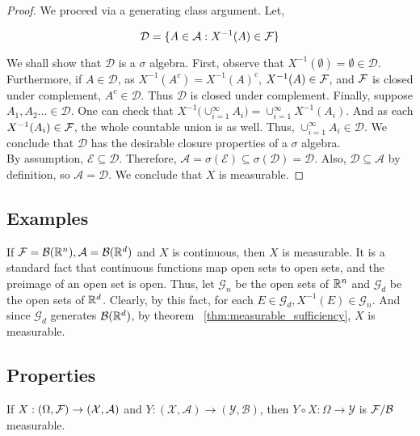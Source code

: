 \begin{proof}
    We proceed via a generating class argument. Let, 

    \[ \mathcal D = \{ A \in \mathcal A : X^{-1}(A) \in \mathcal F \} \]

    We shall show that $\mathcal D$ is a $\sigma$ algebra. First, observe that 
    $X^{-1}(\emptyset) = \emptyset \in \mathcal D$. Furthermore, if $A \in \mathcal D$, as 
    $X^{-1}(A^c) = X^{-1}(A)^c$, $X^{-1}(A) \in \mathcal F$, and $\mathcal F$ is closed under complement, 
    $A^c \in \mathcal D$. Thus $\mathcal D$ is closed under complement. Finally, suppose
    $A_1, A_2... \in \mathcal D$. One can check that $X^{-1}\big( \cup_{i=1}^\infty A_i \big) = \cup_{i=1}^\infty X^{-1}(A_i)$.
    And as each $X^{-1}(A_i) \in \mathcal F$, the whole countable union is as well. Thus, $\cup_{i=1}^\infty 
    A_i \in \mathcal D$. We conclude that $\mathcal D$ has the desirable closure properties of a 
    $\sigma$ algebra. \\ 

    By assumption, $\mathcal E \subseteq \mathcal D$. Therefore, 
    $\mathcal A = \sigma(\mathcal E) \subseteq \sigma(\mathcal D) = \mathcal D$. 
    Also, $\mathcal D \subseteq \mathcal A$ by definition, so $\mathcal A = \mathcal D$. 
    We conclude that $X$ is measurable.
\end{proof}

\subsection{Examples}

If $\mathcal F = \mathcal B(\mathbb R^{n}), \mathcal A = \mathcal B(\mathbb R^d)$ and $X$ is continuous, 
then $X$ is measurable. It is a standard fact that continuous functions map open sets 
to open sets, and the preimage of an open set is open. Thus, let $\mathcal G_n$ be the open sets of $\mathbb R^n$ and 
$\mathcal G_d$ be the open sets of $\mathbb R^d$. Clearly, by this fact, for each 
$E \in \mathcal G_d, X^{-1}(E) \in \mathcal G_n$. And since $\mathcal G_d$ generates 
$\mathcal B(\mathbb R^d)$, by theorem ~\ref{thm:measurable_sufficiency}, $X$ is measurable.

\subsection{Properties}

\begin{theorem}
If $X : (\Omega, \mathcal F) \to (\mathcal X, \mathcal A)$ and $Y : (\mathcal X, \mathcal A)\to (\mathcal Y, \mathcal B)$, then 
$Y \circ X : \Omega \to \mathcal Y$ is $\mathcal F / \mathcal B$ measurable.
\end{theorem}

